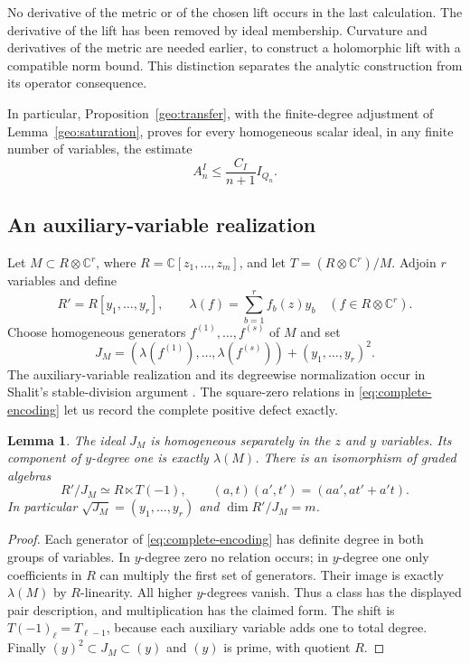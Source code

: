 \documentclass[11pt,reqno]{amsart}
\numberwithin{equation}{section}
\newtheorem{lemma}[theorem]{Lemma}
\theoremstyle{definition}
\theoremstyle{remark}
\newcommand{\C}{\mathbb C}
\begin{document}
No derivative of the metric or of the chosen lift occurs in the last
calculation.  The derivative of the lift has been removed by ideal
membership.  Curvature and derivatives of the metric are needed earlier,
to construct a holomorphic lift with a compatible norm bound.  This
distinction separates the analytic construction from its operator
consequence.


In particular, Proposition~\ref{geo:transfer}, with the finite-degree
adjustment of Lemma~\ref{geo:saturation}, proves for every homogeneous
scalar ideal, in any finite number of variables, the estimate
\begin{equation}\label{eq:complete-scalar}
 A_n^I\le\frac{C_I}{n+1}I_{Q_n}.
\end{equation}

\subsection{An auxiliary-variable realization}
Let $M\subset R\otimes\C^r$, where $R=\C[z_1,\ldots,z_m]$, and
let $T=(R\otimes\C^r)/M$.  Adjoin $r$ variables and define
\[
 R'=R[y_1,\ldots,y_r],\qquad
 \lambda(f)=\sum_{b=1}^r f_b(z)y_b\quad(f\in R\otimes\C^r).
\]
Choose homogeneous generators $f^{(1)},\ldots,f^{(s)}$ of $M$ and set
\begin{equation}\label{eq:complete-encoding}
 J_M=(\lambda(f^{(1)}),\ldots,\lambda(f^{(s)}))+(y_1,\ldots,y_r)^2.
\end{equation}
The auxiliary-variable realization and its degreewise normalization
occur in Shalit's stable-division argument
\cite[Section~5, equation~(5.1)]{ShalitDivision}.  The square-zero
relations in \eqref{eq:complete-encoding} let us record the complete
positive defect exactly.

\begin{lemma}\label{complete:ring}
The ideal $J_M$ is homogeneous separately in the $z$ and $y$ variables.
Its component of $y$-degree one is exactly $\lambda(M)$.  There is an
isomorphism of graded algebras
\[
 R'/J_M\simeq R\ltimes T(-1),
 \qquad (a,t)(a',t')=(aa',at'+a't).
\]
In particular $\sqrt{J_M}=(y_1,\ldots,y_r)$ and
$\dim R'/J_M=m$.
\end{lemma}
\begin{proof}
Each generator of \eqref{eq:complete-encoding} has definite degree in
both groups of variables.  In $y$-degree zero no relation occurs; in
$y$-degree one only coefficients in $R$ can multiply the first set of
generators.  Their image is exactly $\lambda(M)$ by $R$-linearity.
All higher $y$-degrees vanish.  Thus a class has the displayed pair
description, and multiplication has the claimed form.  The shift is
$T(-1)_\ell=T_{\ell-1}$, because each auxiliary variable adds one to
total degree.  Finally
$(y)^2\subset J_M\subset(y)$ and $(y)$ is prime, with quotient $R$.
\end{proof}
\end{document}
